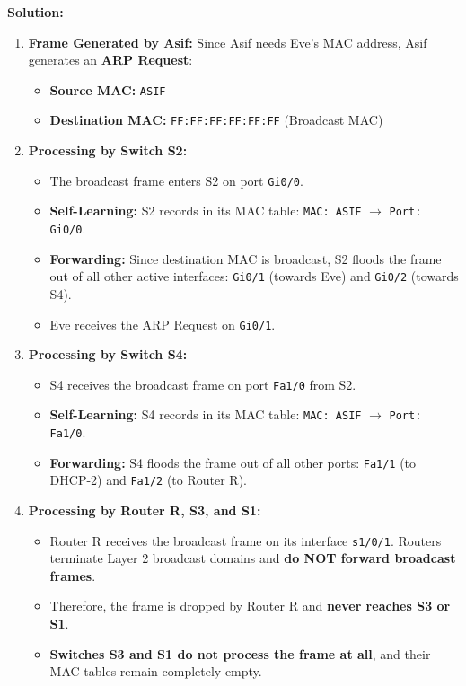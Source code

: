 \documentclass[11pt,a4paper]{article}
\begin{document}
\textbf{Solution:}
\begin{enumerate}
    \item \textbf{Frame Generated by Asif:}
    Since Asif needs Eve's MAC address, Asif generates an \textbf{ARP Request}:
    \begin{itemize}
        \item \textbf{Source MAC:} \texttt{ASIF}
        \item \textbf{Destination MAC:} \texttt{FF:FF:FF:FF:FF:FF} (Broadcast MAC)
    \end{itemize}

    \item \textbf{Processing by Switch S2:}
    \begin{itemize}
        \item The broadcast frame enters S2 on port \texttt{Gi0/0}.
        \item \textbf{Self-Learning:} S2 records in its MAC table: \texttt{MAC: ASIF} $\to$ \texttt{Port: Gi0/0}.
        \item \textbf{Forwarding:} Since destination MAC is broadcast, S2 floods the frame out of all other active interfaces: \texttt{Gi0/1} (towards Eve) and \texttt{Gi0/2} (towards S4).
        \item Eve receives the ARP Request on \texttt{Gi0/1}.
    \end{itemize}

    \item \textbf{Processing by Switch S4:}
    \begin{itemize}
        \item S4 receives the broadcast frame on port \texttt{Fa1/0} from S2.
        \item \textbf{Self-Learning:} S4 records in its MAC table: \texttt{MAC: ASIF} $\to$ \texttt{Port: Fa1/0}.
        \item \textbf{Forwarding:} S4 floods the frame out of all other ports: \texttt{Fa1/1} (to DHCP-2) and \texttt{Fa1/2} (to Router R).
    \end{itemize}

    \item \textbf{Processing by Router R, S3, and S1:}
    \begin{itemize}
        \item Router R receives the broadcast frame on its interface \texttt{s1/0/1}. Routers terminate Layer 2 broadcast domains and \textbf{do NOT forward broadcast frames}.
        \item Therefore, the frame is dropped by Router R and \textbf{never reaches S3 or S1}.
        \item \textbf{Switches S3 and S1 do not process the frame at all}, and their MAC tables remain completely empty.
    \end{itemize}
\end{enumerate}
\end{document}
